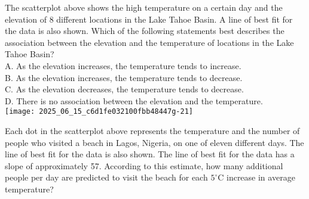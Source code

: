 The scatterplot above shows the high temperature on a certain day and the elevation of 8 different locations in the Lake Tahoe Basin. A line of best fit for the data is also shown. Which of the following statements best describes the association between the elevation and the temperature of locations in the Lake Tahoe Basin?\\
A. As the elevation increases, the temperature tends to increase.\\
B. As the elevation increases, the temperature tends to decrease.\\
C. As the elevation decreases, the temperature tends to decrease.\\
D. There is no association between the elevation and the temperature.\\





























































\texttt{[image: 2025\_06\_15\_c6d1fe032100fbb48447g-21]}

Each dot in the scatterplot above represents the temperature and the number of people who visited a beach in Lagos, Nigeria, on one of eleven different days. The line of best fit for the data is also shown. The line of best fit for the data has a slope of approximately 57. According to this estimate, how many additional people per day are predicted to visit the beach for each $5^{\circ} \mathrm{C}$ increase in average temperature?


